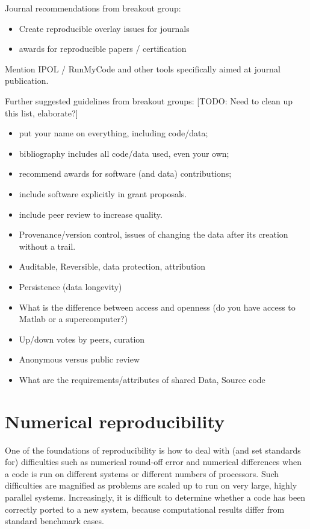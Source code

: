 \documentclass[11pt]{article}
\newcommand{\todo}[1]{{\color{red} [TODO: #1]}}
\newcommand{\todo}[1]{}
\begin{document}
Journal recommendations from breakout group:

\begin{itemize} 
\item Create reproducible overlay issues for journals
\item awards for reproducible papers / certification
\end{itemize} 

Mention IPOL / RunMyCode and other tools specifically aimed at journal
publication.

Further suggested guidelines from breakout groups:
\todo{Need to clean up this list, elaborate?}

\begin{itemize} 
\item    put your name on everything, including code/data;
\item    bibliography includes all code/data used, even your own;
\item    recommend awards for software (and data) contributions;
\item    include software explicitly in grant proposals.

\item   include peer review to increase quality.
\item   Provenance/version control, issues of changing the data after its
creation without a trail.
\item   Auditable, Reversible, data protection, attribution
\item   Persistence (data longevity)
\item   What is the difference between access and openness (do you have access
to Matlab or a supercomputer?)
\item   Up/down votes by peers, curation
\item   Anonymous versus public review
\item   What are the requirements/attributes of shared Data, Source code
\end{itemize} 



\section{Numerical reproducibility} \label{sec:numerical}
One of the foundations of reproducibility is how to deal with (and set
standards for) difficulties such as numerical round-off error and numerical
differences when a code is run on different systems or different numbers of
processors.  Such difficulties are magnified as problems are scaled up to
run on very large, highly parallel systems.  Increasingly, it is difficult
to determine whether a code has been correctly ported to a new system,
because computational results differ from standard benchmark cases.
\end{document}
